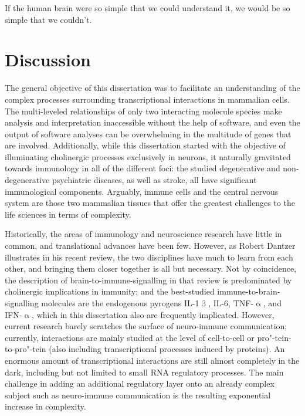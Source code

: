 \newpage\null\pagestyle{plain}\newpage

\pagestyle{fancy}
\fancyhf{}
\renewcommand{\sectionmark}[1]{\markright{#1}} %
\fancyhead[le,ro]{\nouppercase{\rightmark}}
\fancyfoot[le,ro]{\thepage}
\renewcommand{\headrulewidth}{.4pt}
\renewcommand{\footrulewidth}{.4pt}

\begin{savequote}[82mm]
If the human brain were so simple that we could understand it, we would be so simple that we couldn’t.
\end{savequote}

\chapter{Discussion}
The general objective of this dissertation was to facilitate an understanding of the complex processes surrounding transcriptional interactions in mammalian cells. The multi-leveled relationships of only two interacting molecule species make analysis and interpretation inaccessible without the help of software, and even the output of software analyses can be overwhelming in the multitude of genes that are involved. Additionally, while this dissertation started with the objective of illuminating cholinergic processes exclusively in neurons, it naturally gravitated towards immunology in all of the different foci: the studied degenerative and non-degenerative psychiatric diseases, as well as stroke, all have significant immunological components. Arguably, immune cells and the central nervous system are those two mammalian tissues that offer the greatest challenges to the life sciences in terms of complexity. 

Historically, the areas of immunology and neuroscience research have little in common, and translational advances have been few. However, as Robert Dantzer illustrates in his recent review,\cite{Dantzer2018} the two disciplines have much to learn from each other, and bringing them closer together is all but necessary. Not by coincidence, the description of brain-to-immune-signalling in that review is predominated by cholinergic implications in immunity; and the best-studied immune-to-brain-signalling molecules are the endogenous pyrogens IL-1$\upbeta$, IL-6, TNF-$\upalpha$, and IFN-$\upalpha$, which in this dissertation also are frequently implicated. However, current research barely scratches the surface of neuro-immune communication; currently, interactions are mainly studied at the level of cell-to-cell or pro"-tein-to-pro"-tein (also including transcriptional processes induced by proteins). An enormous amount of transcriptional interactions are still almost completely in the dark, including but not limited to small RNA regulatory processes. The main challenge in adding an additional regulatory layer onto an already complex subject such as neuro-immune communication is the resulting exponential increase in complexity.

